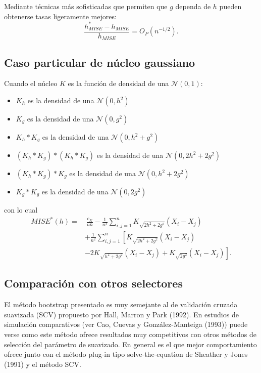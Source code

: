 \documentclass[]{book}
\theoremstyle{definition}
\theoremstyle{definition}
\theoremstyle{definition}
\theoremstyle{remark}
\begin{document}
Mediante técnicas más sofisticadas que permiten que \(g\) dependa de
\(h\) pueden obtenerse tasas ligeramente
mejores:\[\frac{h_{MISE}^{\ast}-h_{MISE}}{h_{MISE}}=O_{P}\left( n^{-1/2} \right).\]

\subsection{Caso particular de núcleo
gaussiano}\label{caso-particular-de-nucleo-gaussiano}

Cuando el núcleo \(K\) es la función de densidad de una
\(\mathcal{N}\left( 0,1 \right)\):

\begin{itemize}
\item
  \(K_{h}\) es la densidad de una \(\mathcal{N}\left( 0,h^2 \right)\)
\item
  \(K_{g}\) es la densidad de una \(\mathcal{N}\left( 0,g^2 \right)\)
\item
  \(K_{h}\ast K_{g}\) es la densidad de una
  \(\mathcal{N}\left( 0,h^2+g^2 \right)\)
\item
  \(\left( K_{h}\ast K_{g} \right) \ast \left( K_{h}\ast K_{g} \right)\)
  es la densidad de una \(\mathcal{N}\left( 0,2h^2+2g^2 \right)\)
\item
  \(\left( K_{h}\ast K_{g} \right) \ast K_{g}\) es la densidad de una
  \(\mathcal{N}\left( 0,h^2+2g^2 \right)\)
\item
  \(K_{g}\ast K_{g}\) es la densidad de una
  \(\mathcal{N}\left( 0,2g^2 \right)\)
\end{itemize}

con lo cual \[\begin{aligned}
MISE^{\ast}\left( h \right) =&\ \frac{c_{K}}{nh}-\frac{1}{n^{3}}
\sum_{i,j=1}^{n}K_{\sqrt{2h^2+2g^2}}\left( X_i-X_j \right) \\
&+\frac{1}{n^2}\sum_{i,j=1}^{n}\left[ K_{\sqrt{2h^2+2g^2}}\left(
X_i-X_j \right) \right. \\
&\left. -2K_{\sqrt{h^2+2g^2}}\left( X_i-X_j \right) +K_{\sqrt{2g^2}
}\left( X_i-X_j \right) \right] .
\end{aligned}\]

\subsection{Comparación con otros
selectores}\label{comparacion-con-otros-selectores}

El método bootstrap presentado es muy semejante al de validación cruzada
suavizada (SCV) propuesto por Hall, Marron y Park (1992). En estudios de
simulación comparativos (ver Cao, Cuevas y González-Manteiga (1993))
puede verse como este método ofrece resultados muy competitivos con
otros métodos de selección del parámetro de suavizado. En general es el
que mejor comportamiento ofrece junto con el método plug-in tipo
solve-the-equation de Sheather y Jones (1991) y el método SCV.
\end{document}
